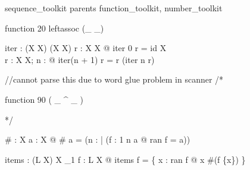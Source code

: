 \zsection sequence\_toolkit parents function\_toolkit, number\_toolkit\\

\begin{zed}
  function 20 leftassoc (\_ \upto \_)
\end{zed}


\begin{gendef}[X]
  iter : \nat \fun (X \rel X) \fun (X \rel X)
\where
  \forall r : X \rel X @ iter 0 r = id X\\
  \forall r : X \rel X; n : \nat @ iter(n + 1) r = r \comp (iter n r)
\end{gendef}

//cannot parse this due to word glue problem in scanner
/*
\begin{zed}
  function 90 ( \_ ^{ \_ } )
\end{zed}

*/

\begin{gendef}[X]
  \# : \finset X \fun \nat
\where
  \forall a : \finset X @ \# a = 
     (\mu n : \nat | (\exists f : 1 \upto n \mapsto a @ ran f = a))
\end{gendef}



\begin{gendef}[L,X]
  items : (L \ffun X) \fun X \pfun \nat_1
\where
  \forall f : L \ffun X @
     items f = \{ x : ran f @ x \mapsto \#(f \rres \{x\}) \}
\end{gendef}

